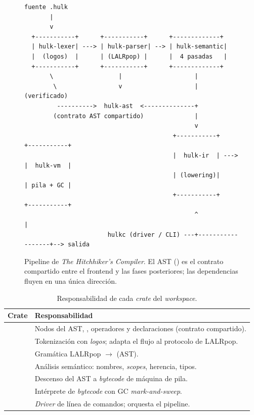 \documentclass[14pts,runningheads,a4paper]{llncs}
\newcommand{\code}[1]{\texttt{\detokenize{#1}}}
\begin{document}
\begin{figure}[h]
\centering
\begin{lstlisting}[basicstyle=\ttfamily\scriptsize,frame=none,backgroundcolor=\color{white},numbers=none]
  fuente .hulk
       |
       v
  +-----------+      +-----------+      +-------------+
  | hulk-lexer| ---> | hulk-parser| --> | hulk-semantic|
  |  (logos)  |      | (LALRpop) |      |  4 pasadas   |
  +-----------+      +-----------+      +-------------+
       \                  |                    |
        \                 v                    | (verificado)
         ---------->  hulk-ast  <--------------+
        (contrato AST compartido)              |
                                               v
                                         +-----------+      +-----------+
                                         |  hulk-ir  | ---> |  hulk-vm  |
                                         | (lowering)|      | pila + GC |
                                         +-----------+      +-----------+
                                               ^                  |
                       hulkc (driver / CLI) ---+------------------+--> salida
\end{lstlisting}
\caption{Pipeline de \emph{The Hitchhiker's Compiler}. El AST (\code{hulk-ast}) es
el contrato compartido entre el frontend y las fases posteriores; las dependencias
fluyen en una \'unica direcci\'on.}
\label{fig:pipeline}
\end{figure}

\begin{table}[h!]
\centering
\caption{Responsabilidad de cada \emph{crate} del \emph{workspace}.}
\label{tab:crates}
\begin{tabular}{@{}ll@{}}
\toprule
\textbf{Crate} & \textbf{Responsabilidad} \\
\midrule
\code{hulk-ast}      & Nodos del AST, \code{Span}, operadores y declaraciones (contrato compartido). \\
\code{hulk-lexer}    & Tokenizaci\'on con \emph{logos}; adapta el flujo al protocolo de LALRpop. \\
\code{hulk-parser}   & Gram\'atica LALRpop $\rightarrow$ \code{Program} (AST). \\
\code{hulk-semantic} & An\'alisis sem\'antico: nombres, \emph{scopes}, herencia, tipos. \\
\code{hulk-ir}       & Descenso del AST a \emph{bytecode} de m\'aquina de pila. \\
\code{hulk-vm}       & Int\'erprete de \emph{bytecode} con GC \emph{mark-and-sweep}. \\
\code{hulkc}         & \emph{Driver} de l\'inea de comandos; orquesta el pipeline. \\
\bottomrule
\end{tabular}
\end{table}
\end{document}
